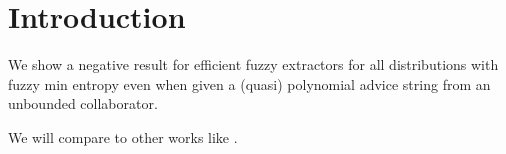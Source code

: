 
\section{Introduction}
We show a negative result for efficient fuzzy extractors for all distributions with fuzzy min entropy even when given a (quasi) polynomial advice string from an unbounded collaborator. 

We will compare to other works like \cite{fuller2016fuzzy,fuller2019continuous,fuller2020fuzzy}. 